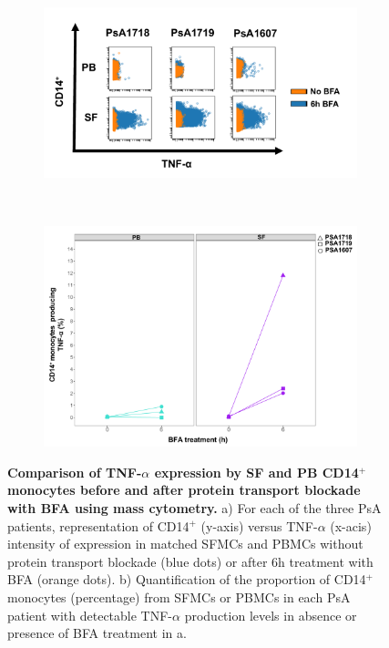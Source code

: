 \bigskip
\begin{figure}[H]
\centering
\begin{subfigure}[b]{0.80\textwidth}
\centering 
\includegraphics[width=\textwidth]{./Results3/pdfs/PSA_0h_6h_BFA_TNFa_mass_cytometry_PSA1718_PSA1719_PSA1607}
\caption{}
\end{subfigure}
~
\begin{subfigure}[b]{0.65\textwidth} 
\centering
\includegraphics[width=\textwidth]{./Results3/pdfs/PSA_percent_monocytes_producing_TNFa_PB_and_SF}
\caption{}
\end{subfigure}
\caption[Comparison of TNF-$\alpha$ expression in SF and PB CD14$^+$ monocytes before and after protein transport blockade with BFA using mass cytometry.]{\textbf{Comparison of TNF-$\alpha$ expression by SF and PB CD14$^+$ monocytes before and after protein transport blockade with BFA using mass cytometry.} a) For each of the three PsA patients, representation of CD14$^+$ (y-axis) versus TNF-$\alpha$ (x-acis) intensity of expression in matched SFMCs and PBMCs without protein transport blockade (blue dots) or after 6h treatment with BFA (orange dots). b) Quantification of the proportion of CD14$^+$ monocytes (percentage) from SFMCs or PBMCs in each PsA patient with detectable TNF-$\alpha$ production levels in absence or presence of BFA treatment in a.}
\label{figure:PsA_monocytes_percentage_TNFa}
\end{figure}


